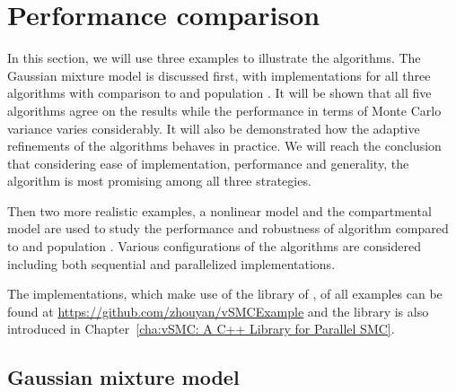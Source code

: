 \section{Performance comparison}
\label{sec:Performance comparison}

In this section, we will use three examples to illustrate the algorithms. The Gaussian mixture model is discussed first, with implementations for all three \smc algorithms with comparison to \rjmcmc and population \mcmc. It will be shown that all five algorithms agree on the results while the performance in terms of Monte Carlo variance varies considerably. It will also be demonstrated how the adaptive refinements of the algorithms behaves in practice. We will reach the conclusion that considering ease of implementation, performance and generality, the \smc[2] algorithm is most promising among all three strategies.

Then two more realistic examples, a nonlinear \ode model and the \pet compartmental model are used to study the performance and robustness of algorithm \smc[2] compared to \ais and population \mcmc. Various configurations of the algorithms are considered including both sequential and parallelized implementations.

The \cpp implementations, which make use of the \vsmc library of \cite{vsmcjss}, of all examples can be found at \url{https://github.com/zhouyan/vSMCExample} and the library is also introduced in Chapter~\ref{cha:vSMC: A C++ Library for Parallel SMC}.

\subsection{Gaussian mixture model}
\label{sub:Gaussian mixture model}

